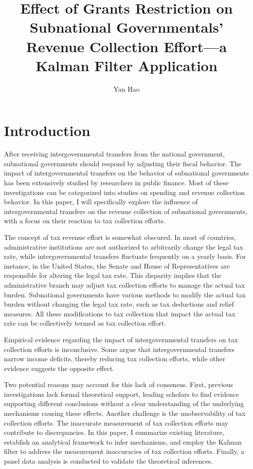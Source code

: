 \documentclass[man]{apa7}
\title{Effect of Grants Restriction on Subnational Governmentals' Revenue Collection Effort---a Kalman Filter Application}
\author{Yan Hao}
\affiliation{Pennsylvania State University\\School of Public Affairs}
\begin{document}
\maketitle

\section{Introduction}
After receiving intergovernmental transfers from the national government, subnational governments should respond by adjusting their fiscal behavior. The impact of intergovernmental transfers on the behavior of subnational governments has been extensively studied by researchers in public finance. Most of these investigations can be categorized into studies on spending and revenue collection behavior. In this paper, I will specifically explore the influence of intergovernmental transfers on the revenue collection of subnational governments, with a focus on their reaction to tax collection efforts.

The concept of tax revenue effort is somewhat obscured. In most of countries, administrative institutions are not authorized to arbitrarily change the legal tax rate, while intergovernmental transfers fluctuate frequently on a yearly basis. For instance, in the United States, the Senate and House of Representatives are responsible for altering the legal tax rate. This disparity implies that the administrative branch may adjust tax collection efforts to manage the actual tax burden. Subnational governments have various methods to modify the actual tax burden without changing the legal tax rate, such as tax deductions and relief measures. All these modifications to tax collection that impact the actual tax rate can be collectively termed as tax collection effort.

Empirical evidence regarding the impact of intergovernmental transfers on tax collection efforts is inconclusive. Some argue that intergovernmental transfers narrow income deficits, thereby reducing tax collection efforts, while other evidence suggests the opposite effect.

Two potential reasons may account for this lack of consensus. First, previous investigations lack formal theoretical support, leading scholars to find evidence supporting different conclusions without a clear understanding of the underlying mechanisms causing these effects. Another challenge is the unobservability of tax collection efforts. The inaccurate measurement of tax collection efforts may contribute to discrepancies. In this paper, I summarize existing literature, establish an analytical framework to infer mechanisms, and employ the Kalman filter to address the measurement inaccuracies of tax collection efforts. Finally, a panel data analysis is conducted to validate the theoretical inferences.
\end{document}
